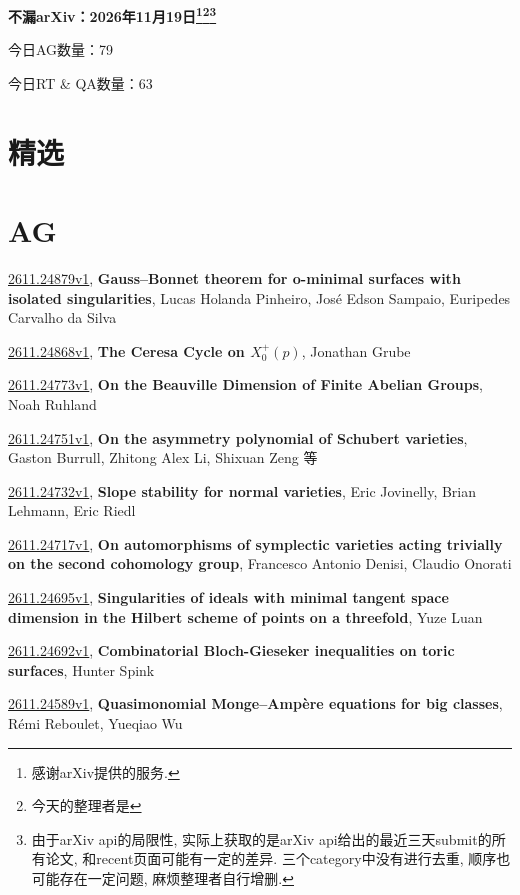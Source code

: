 \documentclass[9pt, a4paper]{article}
\theoremstyle{plain}
\theoremstyle{definition}
\theoremstyle{remark}
\newcommand{\arxiv}[3]{\href{https://arxiv.org/abs/#1}{#1}, \textbf{\textcolor{arxivblue}{#2}}, #3}
\newcommand{\AGnumber}{79}
\newcommand{\RTQAnumber}{63}
\newcommand{\NewestDate}{2026年11月19日}
\newcommand{\todayarXiver}{} %
\begin{document}
\begin{center}
    \Huge\textbf{不漏arXiv：\NewestDate\footnote{感谢arXiv提供的服务.}\footnote{今天的整理者是\todayarXiver}\footnote{由于arXiv api的局限性, 实际上获取的是arXiv api给出的最近三天submit的所有论文, 和recent页面可能有一定的差异. 三个category中没有进行去重, 顺序也可能存在一定问题, 麻烦整理者自行增删.}} \\
\end{center}

\setcounter{section}{-1}

\begin{center}
    今日AG数量：\AGnumber
    
    今日RT \& QA数量：\RTQAnumber
    
\end{center}


\section{精选}


\section{AG}
\arxiv{2611.24879v1}{Gauss--Bonnet theorem for o-minimal surfaces with isolated singularities}{Lucas Holanda Pinheiro, José Edson Sampaio, Euripedes Carvalho da Silva}

\arxiv{2611.24868v1}{The Ceresa Cycle on $X_0^+(p)$}{Jonathan Grube}

\arxiv{2611.24773v1}{On the Beauville Dimension of Finite Abelian Groups}{Noah Ruhland}

\arxiv{2611.24751v1}{On the asymmetry polynomial of Schubert varieties}{Gaston Burrull, Zhitong Alex Li, Shixuan Zeng 等}

\arxiv{2611.24732v1}{Slope stability for normal varieties}{Eric Jovinelly, Brian Lehmann, Eric Riedl}

\arxiv{2611.24717v1}{On automorphisms of symplectic varieties acting trivially on the second cohomology group}{Francesco Antonio Denisi, Claudio Onorati}

\arxiv{2611.24695v1}{Singularities of ideals with minimal tangent space dimension in the Hilbert scheme of points on a threefold}{Yuze Luan}

\arxiv{2611.24692v1}{Combinatorial Bloch-Gieseker inequalities on toric surfaces}{Hunter Spink}

\arxiv{2611.24589v1}{Quasimonomial Monge--Ampère equations for big classes}{Rémi Reboulet, Yueqiao Wu}
\end{document}
